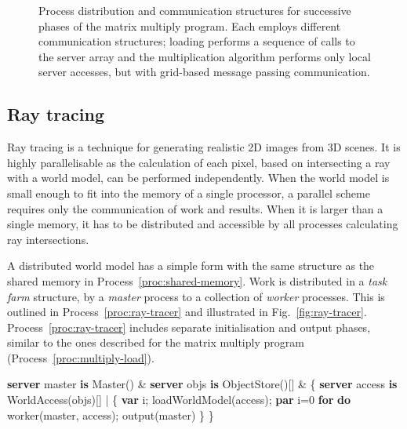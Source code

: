 \documentclass[11pt, conference, compsocconf, onecolumn]{IEEEtran}
\newcommand{\fig}[1]{Fig.~\ref{fig:#1}}
\newcommand{\proc}[1]{Process~\ref{proc:#1}}
\newcounter{process}
\newenvironment{Process}[1][]{\begin{procfloat}[ht]\vspace{-1.5mm}\refstepcounter{process}{\bf Process~\theprocess} #1}
{\vspace{-3.5mm}\end{procfloat}}
\newcommand{\w}[1]{{\bf #1}}
\def\codespacing{1.5mm}
\newenvironment{myquote}
{\list{}{\leftmargin=4mm\rightmargin=4mm}\item[]}
{\endlist}
\newenvironment{code*}{\vspace{\codespacing}\begin{myquote}\begin{minipage}{\linewidth}\begin{alltt}}
{\end{alltt}\end{minipage}
\end{myquote}\vspace{\codespacing}
}
\begin{document}
\begin{figure*}[t]
{ \label{fig:multiply-comp}}

\caption{Process distribution and communication structures for successive
  phases of the matrix multiply program. Each employs different communication
  structures; loading performs a sequence of calls to the server array and the
  multiplication algorithm performs only local server accesses, but with
grid-based message passing communication.}

\label{fig:multiply-phases}
\end{figure*}

\subsection{Ray tracing}

Ray tracing is a technique for generating realistic 2D images from 3D scenes.
It is highly parallelisable as the calculation of each pixel, based on
intersecting a ray with a world model, can be performed independently. When
the world model is small enough to fit into the memory of a single
processor, a parallel scheme requires only the communication of work and
results. 
When it is larger than a single memory, it has to be distributed and accessible
by all processes calculating ray intersections.

A distributed world model has a simple form with the same structure as
the shared memory in \proc{shared-memory}.  Work is distributed in a
\emph{task farm} structure, by a \emph{master} process to a collection of
\emph{worker} processes. 
This is outlined in \proc{ray-tracer} and illustrated in \fig{ray-tracer}.
\proc{ray-tracer} includes separate initialisation and output phases, similar to
the ones described for the matrix multiply program (\proc{multiply-load}). 
\begin{Process}
\begin{code*}
\w{server} master \w{is} Master() &
\w{server} objs \w{is} ObjectStore()[] &
\{ \w{server} access \w{is} WorldAccess(objs)[] |
  \{ \w{var} i;
    loadWorldModel(access);
    \w{par} i=0 \w{for}  \w{do}
      worker(master, access);
    output(master)
  \}
\}
\end{code*}
\label{proc:ray-tracer}
\end{Process}
\end{document}

